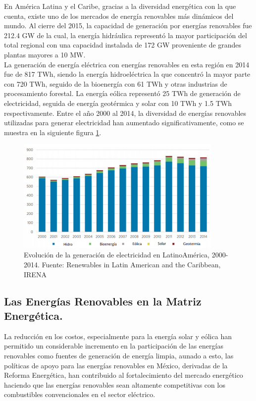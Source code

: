 En América Latina y el Caribe, gracias a la diversidad energética con la que cuenta, existe uno de los mercados de energía renovables más dinámicos del mundo. Al cierre del 2015, la capacidad de generación por energías renovables fue 212.4 GW de la cual, la energía hidráulica representó la mayor participación del total regional con una capacidad instalada de 172 GW proveniente de grandes plantas mayores a 10 MW.\\

La generación de energía eléctrica con energías renovables en esta región en 2014 fue de 817 TWh, siendo la energía hidroeléctrica la que concentró la mayor parte con 720 TWh, seguido de la bioenergía con 61 TWh y otras industrias de procesamiento forestal. La energía eólica representó 25 TWh de generación de electricidad, seguida de energía geotérmica y solar con 10 TWh y 1.5 TWh respectivamente. Entre el año 2000 al 2014, la diversidad de energías renovables utilizadas para generar electricidad han aumentado significativamente, como se muestra en la siguiente figura \ref{2000}. 

\begin{figure}[!h]
	\centering
	\includegraphics[width=10cm]{img/produccion.png}
	\caption{Evolución de la generación de electricidad en LatinoAmérica, 2000-2014. Fuente: Renewables in Latin American and the Caribbean, IRENA}
	\label{2000}
\end{figure}

\subsection{Las Energías Renovables en la Matriz Energética.}

La reducción en los costos, especialmente para la energía solar y eólica han permitido un considerable incremento en la participación de las energías renovables como fuentes de generación de energía limpia, aunado a esto, las políticas de apoyo para las energías renovables en México, derivadas de la Reforma Energética, han contribuido al fortalecimiento del mercado energético haciendo que las energías renovables sean altamente competitivas con los combustibles convencionales en el sector eléctrico.

